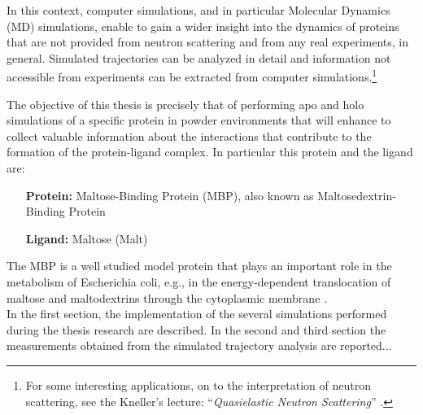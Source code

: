 In this context, computer simulations, and in particular Molecular Dynamics (MD) simulations, enable to gain a wider insight into the dynamics of proteins that are not provided from neutron scattering and from any real experiments, in general. 
Simulated trajectories can be analyzed in detail and information not accessible from experiments can be extracted from computer simulations.\footnote{For some interesting applications, on to the interpretation of neutron scattering, see the Kneller's lecture: ``\textit{Quasielastic Neutron Scattering}'' \cite{ref:QNS_Keller}.}

The objective of this thesis is precisely that of performing apo and holo simulations of a specific protein in powder environments that will enhance to collect valuable information about the interactions that contribute to the formation of the protein-ligand complex. In particular this protein and the ligand are:
\begin{center}
\begin{minipage}{0.65\textwidth}
\begin{itemize}
\item[\textbf{Protein:}] Maltose-Binding Protein (MBP), also known as Maltosedextrin-Binding Protein
\vspace{-0.2cm}
\item[\textbf{Ligand:}] Maltose (Malt)
\end{itemize}
\end{minipage}
\end{center}
The MBP is a well studied model protein that plays an important role in the metabolism of Escherichia coli, e.g., in the energy-dependent translocation of maltose and maltodextrins through the cytoplasmic membrane \cite{paciaroni2008fingerprints}.\\


In the first section, the implementation of the several simulations performed during the thesis research are described. 
In the second and third section the measurements obtained from the simulated trajectory analysis are reported...


